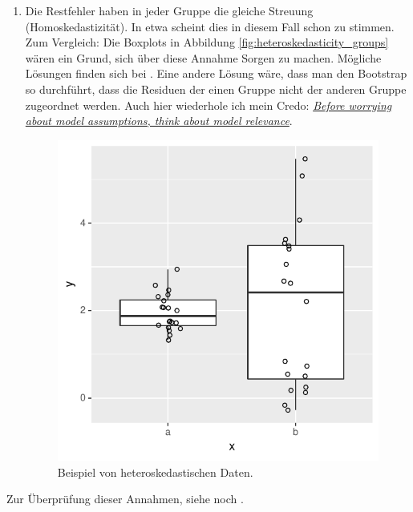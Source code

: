 \documentclass[oneside, 10pt]{book}\usepackage[]{graphicx}\usepackage[]{xcolor}
\newenvironment{knitrout}{}{} %
\begin{document}
\begin{enumerate}
  \item Die Restfehler haben in jeder Gruppe die gleiche
  Streuung (Homoskedastizität). In etwa scheint dies in diesem
  Fall schon zu stimmen. Zum Vergleich:
  Die Boxplots in Abbildung
  \ref{fig:heteroskedasticity_groups} wären ein Grund, sich über diese Annahme Sorgen
  zu machen. Mögliche Lösungen finden sich bei \citet[][Kapitel 4]{Zuur2009}.
  Eine andere Lösung wäre, dass man den Bootstrap so durchführt, dass
  die Residuen der einen Gruppe nicht der anderen Gruppe zugeordnet werden.
  Auch hier wiederhole ich mein Credo: \href{https://janhove.github.io/analysis/2019/04/11/assumptions-relevance}{\textit{Before worrying about model assumptions, think about model relevance}}.
\begin{knitrout}
\color{fgcolor}\begin{figure}[tp]

{\centering \includegraphics[width=.4\textwidth]{figs/unnamed-chunk-261-1} 

}

\caption{Beispiel von heteroskedastischen Daten.\label{fig:heteroskedasticity_groups}}\label{fig:unnamed-chunk-261}
\end{figure}

\end{knitrout}
\end{enumerate}
Zur Überprüfung dieser Annahmen, siehe noch \citet{Vanhove2018b}.
\end{document}
